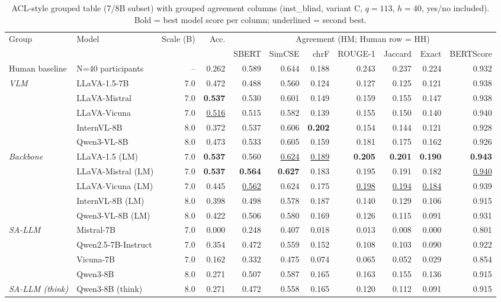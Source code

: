 \begin{table}[t]
\centering
\caption{ACL-style grouped table (7/8B subset) with grouped agreement columns (inst\_blind, variant C, $q=113$, $h=40$, yes/no included). Bold = best model score per column; underlined = second best.}
\label{tab:fig2_acl_grouped_metrics_7b8b}
\small
\setlength{\tabcolsep}{3.5pt}
\begin{tabular}{llrrrrrrrrr}
\toprule
\multirow{2}{*}{Group} & \multirow{2}{*}{Model} & \multirow{2}{*}{Scale (B)} & \multirow{2}{*}{Acc.} & \multicolumn{7}{c}{Agreement (HM; Human row = HH)} \\
 & & & & SBERT & SimCSE & chrF & ROUGE-1 & Jaccard & Exact & BERTScore \\
\cmidrule(lr){5-11}
Human baseline & N=40 participants & -- & 0.262 & 0.589 & 0.644 & 0.188 & 0.243 & 0.237 & 0.224 & 0.932 \\
\midrule
\multirow{5}{*}{\textit{VLM}} & LLaVA-1.5-7B & 7.0 & 0.472 & 0.488 & 0.560 & 0.124 & 0.127 & 0.125 & 0.121 & 0.938 \\
 & LLaVA-Mistral & 7.0 & \textbf{0.537} & 0.530 & 0.601 & 0.149 & 0.159 & 0.155 & 0.147 & 0.938 \\
 & LLaVA-Vicuna & 7.0 & \underline{0.516} & 0.515 & 0.582 & 0.139 & 0.155 & 0.150 & 0.140 & 0.940 \\
 & InternVL-8B & 8.0 & 0.372 & 0.537 & 0.606 & \textbf{0.202} & 0.154 & 0.144 & 0.121 & 0.928 \\
 & Qwen3-VL-8B & 8.0 & 0.473 & 0.533 & 0.605 & 0.159 & 0.181 & 0.175 & 0.162 & 0.926 \\
\midrule
\multirow{5}{*}{\textit{Backbone}} & LLaVA-1.5 (LM) & 7.0 & \textbf{0.537} & 0.560 & \underline{0.624} & \underline{0.189} & \textbf{0.205} & \textbf{0.201} & \textbf{0.190} & \textbf{0.943} \\
 & LLaVA-Mistral (LM) & 7.0 & \textbf{0.537} & \textbf{0.564} & \textbf{0.627} & 0.183 & 0.195 & 0.191 & 0.182 & \underline{0.940} \\
 & LLaVA-Vicuna (LM) & 7.0 & 0.445 & \underline{0.562} & 0.624 & 0.175 & \underline{0.198} & \underline{0.194} & \underline{0.184} & 0.939 \\
 & InternVL-8B (LM) & 8.0 & 0.398 & 0.498 & 0.578 & 0.187 & 0.140 & 0.129 & 0.106 & 0.915 \\
 & Qwen3-VL-8B (LM) & 8.0 & 0.422 & 0.506 & 0.580 & 0.169 & 0.126 & 0.115 & 0.091 & 0.931 \\
\midrule
\multirow{4}{*}{\textit{SA-LLM}} & Mistral-7B & 7.0 & 0.000 & 0.248 & 0.407 & 0.018 & 0.013 & 0.008 & 0.000 & 0.801 \\
 & Qwen2.5-7B-Instruct & 7.0 & 0.354 & 0.472 & 0.559 & 0.152 & 0.108 & 0.103 & 0.090 & 0.922 \\
 & Vicuna-7B & 7.0 & 0.162 & 0.332 & 0.475 & 0.074 & 0.065 & 0.052 & 0.029 & 0.854 \\
 & Qwen3-8B & 8.0 & 0.271 & 0.507 & 0.587 & 0.165 & 0.163 & 0.155 & 0.136 & 0.915 \\
\midrule
\multirow{1}{*}{\textit{SA-LLM (think)}} & Qwen3-8B (think) & 8.0 & 0.271 & 0.472 & 0.558 & 0.165 & 0.120 & 0.112 & 0.091 & 0.915 \\
\bottomrule
\end{tabular}
\end{table}
